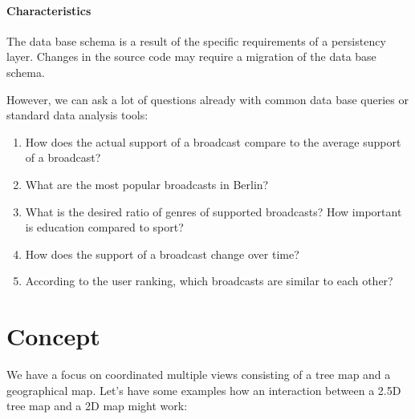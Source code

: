\documentclass{article}
\newcommand{\map}{\textsc{2D} map}
\newcommand{\tmap}{\textsc{2.5D} tree map}
\begin{document}
\paragraph{Characteristics}
The data base schema is a result of the specific requirements of a persistency layer.
Changes in the source code may require a migration of the data base schema.

However, we can ask a lot of questions already with common data base queries or standard data analysis tools:
\begin{enumerate}
  \item
    How does the actual support of a broadcast compare to the average support of a broadcast?
  \item
    What are the most popular broadcasts in Berlin?
  \item
    What is the desired ratio of genres of supported broadcasts? How important is education compared to sport?
  \item
    How does the support of a broadcast change over time?
  \item
    According to the user ranking, which broadcasts are similar to each other?
\end{enumerate}


\clearpage

\section{Concept}\label{sec:concept}


We have a focus on coordinated multiple views consisting of a tree map and a geographical map.
Let's have some examples how an interaction between a \tmap{} and a \map{} might work:
\end{document}
